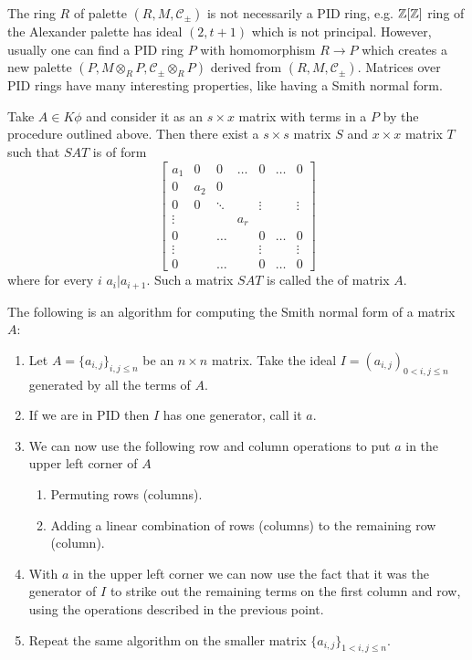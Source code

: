 The ring $R$ of palette $(R, M, \mathcal{C}_\pm)$ is not necessarily a PID ring, e.g. $\operatorname{\mathbb{Z}}[\operatorname{\mathbb{Z}}]$ ring of the Alexander palette has ideal $(2, t+1)$ which is not principal. However, usually one can find a PID ring $P$ with homomorphism $R\to P$ which creates a new palette $(P, M\otimes_R P, \mathcal{C}_\pm\otimes_R P)$ derived from $(R, M, \mathcal{C}_\pm)$. Matrices over PID rings have many interesting properties, like having a Smith normal form.

\begin{definition}
Take $A\in K\phi$ and consider it as an $s\times x$ matrix with terms in a $P$ by the procedure outlined above. Then there exist a $s\times s$ matrix $S$ and $x\times x$ matrix $T$ such that $SAT$ is of form
$$
\begin{bmatrix}
  a_1 & 0 & 0 & \hdots & 0 & \hdots & 0 \\ 
  0 & a_2 & 0\\ 
  0 & 0 & \ddots & & \vdots & & \vdots\\ 
  \vdots & & & a_r\\ 
  0 & & \hdots & & 0 & \hdots & 0 \\ 
  \vdots & & & & \vdots & & \vdots\\ 
  0 & & \hdots & & 0 & \hdots & 0
\end{bmatrix}
$$
where for every $i$ $a_i|a_{i+1}$. Such a matrix $SAT$ is called the  of matrix $A$.
\end{definition}

The following is an algorithm for computing the Smith normal form of a matrix $A$:

\begin{enumerate}
  \item Let $A=\{a_{i,j}\}_{i,j\leq n}$ be an $n\times n$ matrix. Take the ideal $I=(a_{i,j})_{0<i,j\leq n}$ generated by all the terms of $A$. 
  \item If we are in PID then $I$ has one generator, call it $a$.
  \item We can now use the following row and column operations to put $a$ in the upper left corner of $A$
    \begin{enumerate}
      \item Permuting rows (columns).
      \item Adding a linear combination of rows (columns) to the remaining row (column).
    \end{enumerate}
  \item With $a$ in the upper left corner we can now use the fact that it was the generator of $I$ to strike out the remaining terms on the first column and row, using the operations described in the previous point.
  \item Repeat the same algorithm on the smaller matrix  $\{a_{i,j}\}_{1<i, j\leq n}$.
\end{enumerate}

